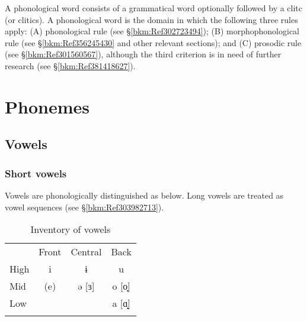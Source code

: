 \noindent A phonological word consists of a grammatical word optionally followed by a clitc (or clitics). A phonological word is the domain in which the following three rules apply: (A) phonological rule (see §\ref{bkm:Ref302723494}); (B) morphophonological rule (see §\ref{bkm:Ref356245430} and other relevant sections); and (C) prosodic rule (see §\ref{bkm:Ref301560567}), although the third criterion is in need of further research (see §\ref{bkm:Ref381418627}).

\section{Phonemes}
\label{bkm:Ref381193872}\hypertarget{RefHeadingToc395696962}{}\label{bkm:Ref347174415}\subsection{Vowels}
\label{bkm:Ref312504424}\hypertarget{RefHeadingToc395696963}{}\subsubsection{Short vowels}
\hypertarget{RefHeadingToc395696964}{}
Vowels are phonologically distinguished as below. Long vowels are treated as vowel sequences (see §\ref{bkm:Ref303982713}).

\begin{table}[H]
\caption{Inventory of vowels}
\begin{tabular}{lccc} 
\lsptoprule
     & Front & Central & Back\\
High &  i    & ɨ       & u\\
Mid  & (e)   & ə [ɜ]   & o [o̞]\\
Low  &       &         & a [ɑ̟]\\
\lspbottomrule
\end{tabular}
\end{table}

